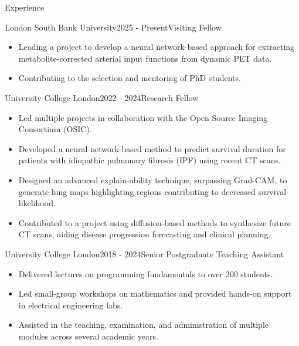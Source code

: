 \documentclass{cv}
\begin{document}
    \begin{rSection}{Experience}
        \item \begin{rSubsection}{London South Bank University}{2025 - Present}{Visiting Fellow}{}
            \item \begin{itemize}
                \item Leading a project to develop a neural network-based approach for extracting metabolite-corrected arterial input functions from dynamic PET data.
                \item Contributing to the selection and mentoring of PhD students.
            \end{itemize}
        \end{rSubsection}
        
        \item \begin{rSubsection}{University College London}{2022 - 2024}{Research Fellow}{}
            \item \begin{itemize}
                \item Led multiple projects in collaboration with the Open Source Imaging Consortium (OSIC).
                \item Developed a neural network-based method to predict survival duration for patients with idiopathic pulmonary fibrosis (IPF) using recent CT scans.
                \item Designed an advanced explain-ability technique, surpassing Grad-CAM, to generate lung maps highlighting regions contributing to decreased survival likelihood.
                \item Contributed to a project using diffusion-based methods to synthesize future CT scans, aiding disease progression forecasting and clinical planning.
            \end{itemize}
        \end{rSubsection}
        
        \item \begin{rSubsection}{University College London}{2018 - 2024}{Senior Postgraduate Teaching Assistant}{}
            \item \begin{itemize}
                \item Delivered lectures on programming fundamentals to over 200 students.
                \item Led small-group workshops on mathematics and provided hands-on support in electrical engineering labs.
                \item Assisted in the teaching, examination, and administration of multiple modules across several academic years.
            \end{itemize}
        \end{rSubsection}
        

\end{rSection}
\end{document}
